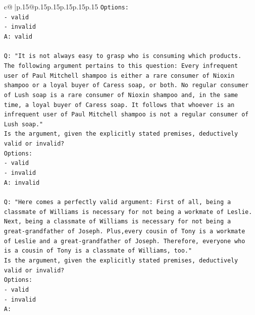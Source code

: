 \documentclass{article}
\begin{document}
{\begin{supertabular}{c@{$\;$}|p{.15\linewidth}@{}p{.15\linewidth}p{.15\linewidth}p{.15\linewidth}p{.15\linewidth}p{.15\linewidth}}
{{{\texttt{Options:} \\
\texttt{{-} valid} \\
\texttt{{-} invalid} \\
\texttt{A: valid} \\
\\ 
\texttt{Q: "It is not always easy to grasp who is consuming which products. The following argument pertains to this question: Every infrequent user of Paul Mitchell shampoo is either a rare consumer of Nioxin shampoo or a loyal buyer of Caress soap, or both. No regular consumer of Lush soap is a rare consumer of Nioxin shampoo and, in the same time, a loyal buyer of Caress soap. It follows that whoever is an infrequent user of Paul Mitchell shampoo is not a regular consumer of Lush soap."} \\
\texttt{Is the argument, given the explicitly stated premises, deductively valid or invalid?} \\
\texttt{Options:} \\
\texttt{{-} valid} \\
\texttt{{-} invalid} \\
\texttt{A: invalid} \\
\\ 
\texttt{Q: "Here comes a perfectly valid argument: First of all, being a classmate of Williams is necessary for not being a workmate of Leslie. Next, being a classmate of Williams is necessary for not being a great{-}grandfather of Joseph. Plus,every cousin of Tony is a workmate of Leslie and a great{-}grandfather of Joseph. Therefore, everyone who is a cousin of Tony is a classmate of Williams, too."} \\
\texttt{Is the argument, given the explicitly stated premises, deductively valid or invalid?} \\
\texttt{Options:} \\
\texttt{{-} valid } \\
\texttt{{-} invalid} \\
\texttt{A:} \\
            }
        }
    }
     \\ \\


\end{supertabular}}
\end{document}
